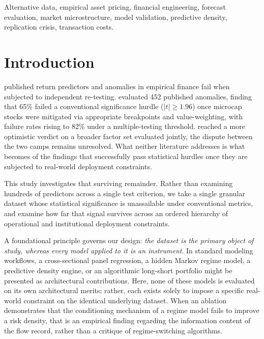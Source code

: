 \documentclass{ieeeaccess}
\begin{document}
\begin{keywords}
Alternative data, empirical asset pricing, financial engineering, forecast evaluation, market microstructure, model validation, predictive density, replication crisis, transaction costs.
\end{keywords}

\titlepgskip=-21pt

\maketitle

\section{Introduction}
\label{sec:introduction}
 published return predictors and anomalies in empirical finance fail when subjected to independent re-testing. \cite{hou2020replicating} evaluated 452 published anomalies, finding that 65\% failed a conventional significance hurdle ($|t| \ge 1.96$) once microcap stocks were mitigated via appropriate breakpoints and value-weighting, with failure rates rising to 82\% under a multiple-testing threshold. \cite{jensen2023there} reached a more optimistic verdict on a broader factor set evaluated jointly, the dispute between the two camps remains unresolved. What neither literature addresses is what becomes of the findings that successfully pass statistical hurdles once they are subjected to real-world deployment constraints.

This study investigates that surviving remainder. Rather than examining hundreds of predictors across a single test criterion, we take a single granular dataset whose statistical significance is unassailable under conventional metrics, and examine how far that signal survives across an ordered hierarchy of operational and institutional deployment constraints.

A foundational principle governs our design: \textit{the dataset is the primary object of study, whereas every model applied to it is an instrument}. In standard modeling workflows, a cross-sectional panel regression, a hidden Markov regime model, a predictive density engine, or an algorithmic long-short portfolio might be presented as architectural contributions. Here, none of these models is evaluated on its own architectural merits; rather, each exists solely to impose a specific real-world constraint on the identical underlying dataset. When an ablation demonstrates that the conditioning mechanism of a regime model fails to improve a risk density, that is an empirical finding regarding the information content of the flow record, rather than a critique of regime-switching algorithms.
\end{document}
